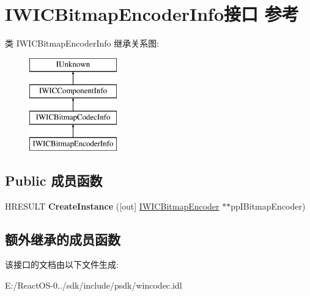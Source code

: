 \hypertarget{interface_i_w_i_c_bitmap_encoder_info}{}\section{I\+W\+I\+C\+Bitmap\+Encoder\+Info接口 参考}
\label{interface_i_w_i_c_bitmap_encoder_info}
类 I\+W\+I\+C\+Bitmap\+Encoder\+Info 继承关系图\+:\begin{figure}[H]
\begin{center}
\leavevmode
\includegraphics[height=4.000000cm]{interface_i_w_i_c_bitmap_encoder_info}
\end{center}
\end{figure}
\subsection*{Public 成员函数}
\begin{DoxyCompactItemize}
\item 
\mbox{\label{interface_i_w_i_c_bitmap_encoder_info_acb01fadc6fd0757416f6da9a4e1196eb}} 
H\+R\+E\+S\+U\+LT {\bfseries Create\+Instance} (\mbox{[}out\mbox{]} \hyperlink{interface_i_w_i_c_bitmap_encoder}{I\+W\+I\+C\+Bitmap\+Encoder} $\ast$$\ast$pp\+I\+Bitmap\+Encoder)
\end{DoxyCompactItemize}
\subsection*{额外继承的成员函数}


该接口的文档由以下文件生成\+:\begin{DoxyCompactItemize}
\item 
E\+:/\+React\+O\+S-\/0../sdk/include/psdk/wincodec.\+idl\end{DoxyCompactItemize}
